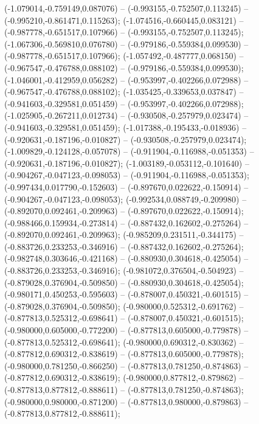  (-1.079014,-0.759149,0.087076) -- (-0.993155,-0.752507,0.113245) -- (-0.995210,-0.861471,0.115263);
 (-1.074516,-0.660445,0.083121) -- (-0.987778,-0.651517,0.107966) -- (-0.993155,-0.752507,0.113245);
 (-1.067306,-0.569810,0.076780) -- (-0.979186,-0.559384,0.099530) -- (-0.987778,-0.651517,0.107966);
 (-1.057492,-0.487777,0.068150) -- (-0.967547,-0.476788,0.088102) -- (-0.979186,-0.559384,0.099530);
 (-1.046001,-0.412959,0.056282) -- (-0.953997,-0.402266,0.072988) -- (-0.967547,-0.476788,0.088102);
 (-1.035425,-0.339653,0.037847) -- (-0.941603,-0.329581,0.051459) -- (-0.953997,-0.402266,0.072988);
 (-1.025905,-0.267211,0.012734) -- (-0.930508,-0.257979,0.023474) -- (-0.941603,-0.329581,0.051459);
 (-1.017388,-0.195433,-0.018936) -- (-0.920631,-0.187196,-0.010827) -- (-0.930508,-0.257979,0.023474);
 (-1.009829,-0.124128,-0.057078) -- (-0.911904,-0.116988,-0.051353) -- (-0.920631,-0.187196,-0.010827);
 (-1.003189,-0.053112,-0.101640) -- (-0.904267,-0.047123,-0.098053) -- (-0.911904,-0.116988,-0.051353);
 (-0.997434,0.017790,-0.152603) -- (-0.897670,0.022622,-0.150914) -- (-0.904267,-0.047123,-0.098053);
 (-0.992534,0.088749,-0.209980) -- (-0.892070,0.092461,-0.209963) -- (-0.897670,0.022622,-0.150914);
 (-0.988466,0.159934,-0.273814) -- (-0.887432,0.162602,-0.275264) -- (-0.892070,0.092461,-0.209963);
 (-0.985209,0.231511,-0.344175) -- (-0.883726,0.233253,-0.346916) -- (-0.887432,0.162602,-0.275264);
 (-0.982748,0.303646,-0.421168) -- (-0.880930,0.304618,-0.425054) -- (-0.883726,0.233253,-0.346916);
 (-0.981072,0.376504,-0.504923) -- (-0.879028,0.376904,-0.509850) -- (-0.880930,0.304618,-0.425054);
 (-0.980171,0.450253,-0.595603) -- (-0.878007,0.450321,-0.601515) -- (-0.879028,0.376904,-0.509850);
 (-0.980000,0.525312,-0.691762) -- (-0.877813,0.525312,-0.698641) -- (-0.878007,0.450321,-0.601515);
 (-0.980000,0.605000,-0.772200) -- (-0.877813,0.605000,-0.779878) -- (-0.877813,0.525312,-0.698641);
 (-0.980000,0.690312,-0.830362) -- (-0.877812,0.690312,-0.838619) -- (-0.877813,0.605000,-0.779878);
 (-0.980000,0.781250,-0.866250) -- (-0.877813,0.781250,-0.874863) -- (-0.877812,0.690312,-0.838619);
 (-0.980000,0.877812,-0.879862) -- (-0.877813,0.877812,-0.888611) -- (-0.877813,0.781250,-0.874863);
 (-0.980000,0.980000,-0.871200) -- (-0.877813,0.980000,-0.879863) -- (-0.877813,0.877812,-0.888611);
